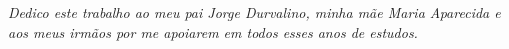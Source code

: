 \newpage

\vspace*{22cm}

\hspace{6cm}\begin{minipage}{.63\textwidth}
            \textit{Dedico este trabalho ao meu pai Jorge Durvalino, minha mãe Maria Aparecida e aos meus irmãos por me apoiarem em todos esses anos de estudos.}
            \end{minipage}